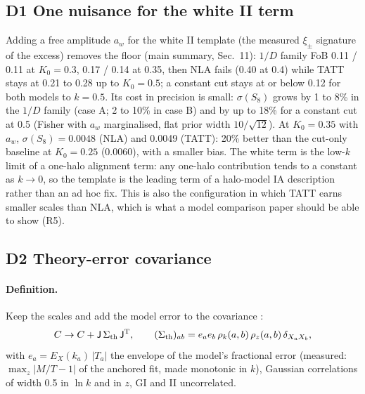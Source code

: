 \documentclass[11pt]{article}
\begin{document}
\subsection{D1 One nuisance for the white II term}
Adding a free amplitude $a_w$ for the white II template (the measured
$\xi_\pm$ signature of the excess) removes the floor (main summary,
Sec.~11): $1/D$ family FoB 0.11 / 0.11 at $K_0 = 0.3$, 0.17 / 0.14 at 0.35,
then NLA fails (0.40 at 0.4) while TATT stays at 0.21 to 0.28 up to $K_0 =
0.5$; a constant cut stays at or below 0.12 for both models to $k = 0.5$. Its
cost in precision is small: $\sigma(S_8)$ grows by 1 to 8\% in the $1/D$
family (case A; 2 to 10\% in case B) and by up to 18\% for a constant cut
at 0.5 (Fisher with $a_w$ marginalised, flat prior width $10/\sqrt{12}$).
At $K_0 = 0.35$ with $a_w$, $\sigma(S_8) = 0.0048$ (NLA) and 0.0049 (TATT):
20\% better than the cut-only baseline at $K_0 = 0.25$ (0.0060), with a
smaller bias. The white term is the low-$k$ limit of a one-halo
alignment term: any one-halo contribution tends to a constant as $k \to 0$,
so the template is the leading term of a halo-model IA description rather
than an ad hoc fix. This is also the configuration in which TATT earns
smaller scales than NLA, which is what a model comparison paper should be able
to show (R5).

\subsection{D2 Theory-error covariance}\label{sec:theory}
\paragraph{Definition.} Keep the scales and add the model error to the
covariance \cite{baldauf16,chudaykin21}:
\begin{equation}
C \to C + \mathsf{J}\,\Sigma_{\rm th}\,\mathsf{J}^{\rm T},\qquad
(\Sigma_{\rm th})_{ab} = e_a e_b\,\rho_k(a,b)\,\rho_z(a,b)\,\delta_{X_aX_b},
\label{eq:th}
\end{equation}
with $e_a = E_X(k_a)\,|T_a|$ the envelope of the model's fractional error
(measured: $\max_z |M/T - 1|$ of the anchored fit, made monotonic in $k$),
Gaussian correlations of width 0.5 in $\ln k$ and in $z$, GI and II
uncorrelated.
\end{document}
